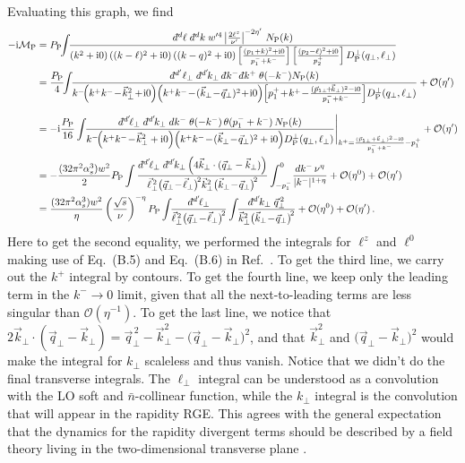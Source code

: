 \documentclass[letterpaper,11pt]{article}
\newcommand{\abs}[1]{\lvert#1\rvert}
\newcommand{\img}{\mathrm{i}}
\newcommand{\cM}{\mathcal{M}}
\newcommand{\cO}{\mathcal{O}}
\newcommand{\as}{\alpha_s}
\newcommand{\nn}{\nonumber}
\newcommand\prp[1]{\vec #1_\perp}
\newcommand\prpsq[1]{\vec{#1}^{2}_\perp}
\newcommand\prpsqm[2]{\bigl( \prp{#1} \!-\! \prp{#2} \bigr)^{\!2}}
\newcommand\prnth[1]{\left(#1\right)}
\newcommand{\bn}{{\bar n}}
\newcommand{\dbar}{d\hspace*{-0.08em}\bar{}\hspace*{0.1em}}
\begin{document}
Evaluating this graph, we find
\begin{align}\label{eq:diagram_planar}
-\img\cM_{\rm{P}}
 &= P_\text{P} \!\!
	\int\!\!\frac{\dbar^d\ell \; \dbar^dk \; w'^4 \left| \frac{2 \ell^z}{\nu'} \right|^{-2 \eta'} \, N_\text{P}(k)}{
	\prnth{k^2 + \img0} \prnth{(k-\ell)^2 + \img0} \prnth{(k-q)^2 + \img0} \left[\frac{\prnth{p_1 +k}^2+\img0}{p_1^- + k^-}\right] 
	\left[\frac{\prnth{p_2 - \ell}^2+\img0}{p_2^+}\right] D_\text{P}^\perp(q_\perp,\ell_\perp)
}
\nn \\
&= \frac{P_\text{P}}{4}
\!\!\int\!\!
\frac{\dbar^{d'}\ell_\perp \; \dbar^{d'}\!k_\perp \, \dbar k^- \dbar k^+ \;   \theta(-k^-) N_\text{P}(k)}{
k^-\!\! \prnth{k^+k^- \!-\!\vec k_\perp^2 \!+\! \img0} \! \prnth{k^+k^- \!-\! (\vec k_\perp \!-\! \vec q_\perp)^2 \!+\! \img0} \! \left[p_1^+\! +\! k^+ \!-\!\frac{(\vec p_{1\perp} \!+\! \vec k_\perp)^2-\img0}{p_1^-+k^-}\right] \!
D_\text{P}^\perp(q_\perp,\ell_\perp) 
}+\cO(\eta')
\nn \\[.1in]
&= -\img \frac{P_\text{P}}{16}
\int\!\!\frac{\dbar^{d'}\!\ell_\perp \; \dbar^{d'}\!k_\perp \; dk^- \; \theta(-k^-) \, \theta(p_1^-+k^-)\, N_\text{P}(k)}{
k^-\!\! \prnth{k^+k^- \! -\! \vec k_\perp^2 + \img0}\! \prnth{k^+k^- \! -\! (\vec k_\perp\!-\!\vec q_\perp)^2 + \img0}
\! D_\text{P}^\perp(q_\perp,\ell_\perp) 
}\Biggr|_{k^+=\frac{(\vec p_{1\perp} +\vec k_\perp)^2-\img0}{p_1^-+k^-}-p_1^+} +\cO(\eta')
\nn\\
&= -\frac{(32 \pi^2 \as^3) w^2 }{2} P_\text{P}
	\int\frac{\dbar^{d'}\!\ell_\perp \; \dbar^{d'}\! k_\perp \left( 4 \prp{k} \cdot (\prp{q} - \prp{k})\right)}{
	\vec\ell_\perp^{\,2} \prpsqm{q}{\ell} \prpsq{k} \prpsqm{k}{q}
}   \int_{-p_1^-}^{0} \!\frac{d k^- \,\nu^\eta}{\abs{k^-}^{1+\eta}} + \cO(\eta^0)+\cO(\eta')
\nn\\
 &=  \frac{(32 \pi^2 \as^3) w^2}{\eta} \left(\frac{\sqrt{s}}{\nu} \right)^{-\eta}   P_\text{P}
	\int\!\! \frac{\dbar^{d'}\!\ell_\perp}{\vec\ell_\perp^{\,2} \prpsqm{q}{\ell}}
  \int\!\! \frac{\dbar^{d'}\!k_\perp \; \vec q_\perp^{\,2}}{
	\prpsq{k} \prpsqm{k}{q}
} + \cO(\eta^0) +\cO(\eta')
\, .
\end{align}
%
Here to get the second equality, we performed the integrals for $\ell^z$ and $\ell^0$ making use of Eq.~(B.5) and Eq.~(B.6) in Ref.~\cite{Rothstein:2016bsq}. To get the third line, we carry out the $k^+$ integral by contours. To get the fourth line, we keep only the leading term in the $k^-\to0$ limit, given that all the next-to-leading terms are less singular than $\cO(\eta^{-1})$. To get the last line, we notice that $2 \prp{k} \cdot (\prp{q} - \prp{k})=\vec q_\perp^{\,2}-\prpsq{k}-\prpsqm{q}{k}$, and that $\prpsq{k}$ and $\prpsqm{q}{k}$ would make the integral for $ k_\perp$ scaleless and thus vanish.
Notice that we didn't do the final transverse integrals.
The $\ell_\perp$ integral can be understood as a convolution with the LO soft and $\bn$-collinear function, while the $ k_\perp$ integral is the convolution that will appear in the rapidity RGE. This agrees with the general expectation that the dynamics for the rapidity divergent terms should be described by a field theory living in the two-dimensional transverse plane \cite{Verlinde:1991iu}.
\end{document}
